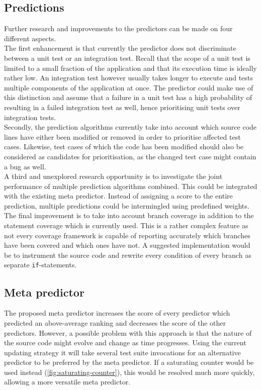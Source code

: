 \subsection{Predictions}
Further research and improvements to the predictors can be made on four different aspects.\\

\noindent The first enhancement is that currently the predictor does not discriminate between a unit test or an integration test. 
Recall that the scope of a unit test is limited to a small fraction of the application and that its execution time is ideally rather low. An integration test however usually takes longer to execute and tests multiple components of the application at once. The predictor could make use of this distinction and assume that a failure in a unit test has a high probability of resulting in a failed integration test as well, hence prioritising unit tests over integration tests.\\

\noindent Secondly, the prediction algorithms currently take into account which source code lines have either been modified or removed in order to prioritise affected test cases. Likewise, test cases of which the code has been modified should also be considered as candidates for prioritisation, as the changed test case might contain a bug as well.\\

\noindent A third and unexplored research opportunity is to investigate the joint performance of multiple prediction algorithms combined. This could be integrated with the existing meta predictor. Instead of assigning a score to the entire prediction, multiple predictions could be intermingled using predefined weights.\\

\noindent The final improvement is to take into account branch coverage in addition to the statement coverage which is currently used. This is a rather complex feature as not every coverage framework is capable of reporting accurately which branches have been covered and which ones have not. A suggested implementation would be to instrument the source code and rewrite every condition of every branch as separate \texttt{if}-statements.

\subsection{Meta predictor}
The proposed meta predictor increases the score of every predictor which predicted an above-average ranking and decreases the score of the other predictors. However, a possible problem with this approach is that the nature of the source code might evolve and change as time progresses. Using the current updating strategy it will take several test suite invocations for an alternative predictor to be preferred by the meta predictor. If a saturating counter would be used instead (\autoref{fig:saturating-counter}), this would be resolved much more quickly, allowing a more versatile meta predictor.

